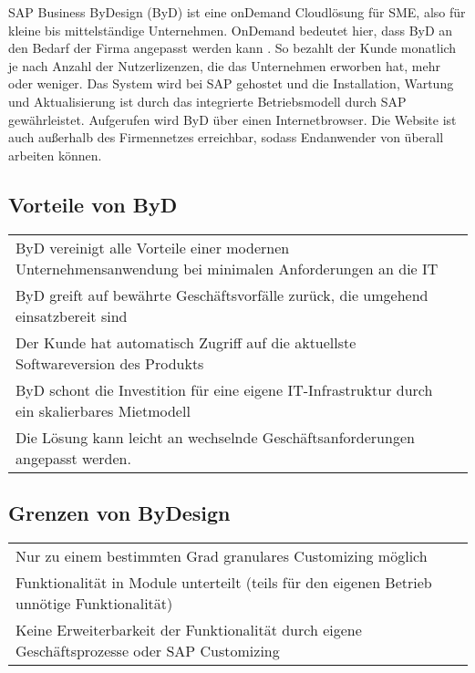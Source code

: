 \documentclass{handout}
\begin{document}
SAP Business ByDesign (ByD) ist eine onDemand Cloudlösung für SME, also für kleine bis mittelständige Unternehmen. OnDemand bedeutet hier, dass ByD an den Bedarf der Firma angepasst werden kann \cite{OnDemandDefinition}. So bezahlt der Kunde monatlich je nach Anzahl der Nutzerlizenzen, die das Unternehmen erworben hat, mehr oder weniger. Das System wird bei SAP gehostet und die Installation, Wartung und Aktualisierung ist durch das integrierte Betriebsmodell durch SAP gewährleistet. Aufgerufen wird ByD über einen Internetbrowser. Die Website ist auch außerhalb des Firmennetzes erreichbar, sodass Endanwender von überall arbeiten können.

\subsection{Vorteile von ByD}

\small
\begin{tabular}{L l}
ByD vereinigt alle Vorteile einer modernen Unternehmensanwendung bei minimalen Anforderungen an die IT\\
ByD greift auf bewährte Geschäftsvorfälle zurück, die umgehend einsatzbereit sind\\
Der Kunde hat automatisch Zugriff auf die aktuellste Softwareversion des Produkts\\
ByD schont die Investition für eine eigene IT-Infrastruktur durch ein skalierbares Mietmodell\\
Die Lösung kann leicht an wechselnde Geschäftsanforderungen angepasst werden.\\
\end{tabular}
\normalsize
\cite{itelligence}

\subsection{Grenzen von ByDesign}

\small
\begin{tabular}{L l}
Nur zu einem bestimmten Grad granulares Customizing möglich\\
Funktionalität in Module unterteilt (teils für den eigenen Betrieb unnötige Funktionalität)\\
Keine Erweiterbarkeit der Funktionalität durch eigene Geschäftsprozesse oder SAP Customizing\\
\end{tabular}
\normalsize


\newpage


\end{document}
